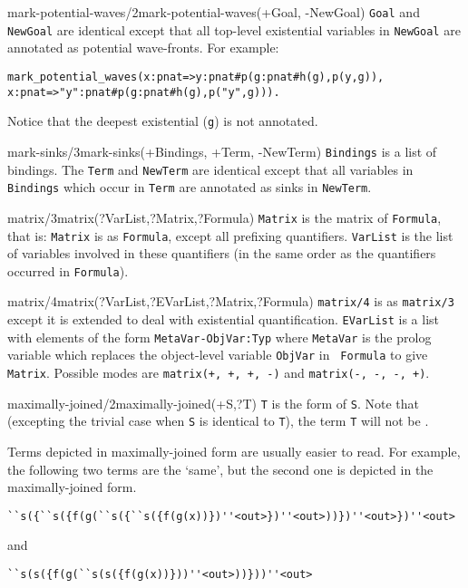 \begin{predicate}{mark-potential-waves/2}{mark-potential-waves(+Goal, -NewGoal)}%
{\tt Goal} and {\tt NewGoal} are identical except that all top-level
existential variables in {\tt NewGoal} are annotated as potential
wave-fronts.  For example:
\begin{verbatim}
mark_potential_waves(x:pnat=>y:pnat#p(g:pnat#h(g),p(y,g)),
x:pnat=>"y":pnat#p(g:pnat#h(g),p("y",g))).
\end{verbatim}
Notice that the deepest existential ({\tt g}) is not annotated.
\end{predicate}

\begin{predicate}{mark-sinks/3}{mark-sinks(+Bindings, +Term, -NewTerm)}%
{\tt Bindings} is a list of bindings. The {\tt Term} and {\tt NewTerm}
are identical except that all variables in {\tt Bindings} which occur
in {\tt Term} are annotated as sinks in {\tt NewTerm}.
\end{predicate}

\begin{predicate}{matrix/3}{matrix(?VarList,?Matrix,?Formula)}%
{\tt Matrix} is the matrix of {\tt Formula}, that is: {\tt Matrix} is
as {\tt Formula}, except all prefixing quantifiers. {\tt VarList} is
the list of variables involved in these quantifiers (in the same order
as the quantifiers occurred in {\tt Formula}).
\end{predicate}

\begin{predicate}{matrix/4}{matrix(?VarList,?EVarList,?Matrix,?Formula)}%
{\tt matrix/4} is as {\tt matrix/3} except it is extended to deal with
existential quantification. {\tt EVarList} is a list with elements of
the form {\tt MetaVar-ObjVar:Typ} where {\tt MetaVar} is the prolog
variable which replaces the object-level variable {\tt ObjVar} in {\tt
Formula} to give {\tt Matrix}. Possible modes are {\tt matrix(+, +, +,
-)} and {\tt matrix(-, -, -, +)}.
\end{predicate}

\begin{predicate}{maximally-joined/2}{maximally-joined(+S,?T)}%
{\tt T} is the  form of {\tt S}.   Note that
(excepting the trivial case when {\tt S} is identical to {\tt T}), the
term {\tt T} will not be .


Terms depicted in maximally-joined form are usually easier to read.
For example, the following two terms are the `same', but the second
one is depicted in the maximally-joined form.

{\small\begin{verbatim}
``s({``s({f(g(``s({``s({f(g(x))})''<out>})''<out>))})''<out>})''<out> 
\end{verbatim}
}
and
{\small\begin{verbatim}
``s(s({f(g(``s(s({f(g(x))}))''<out>))}))''<out> 
\end{verbatim}
}
\end{predicate}

